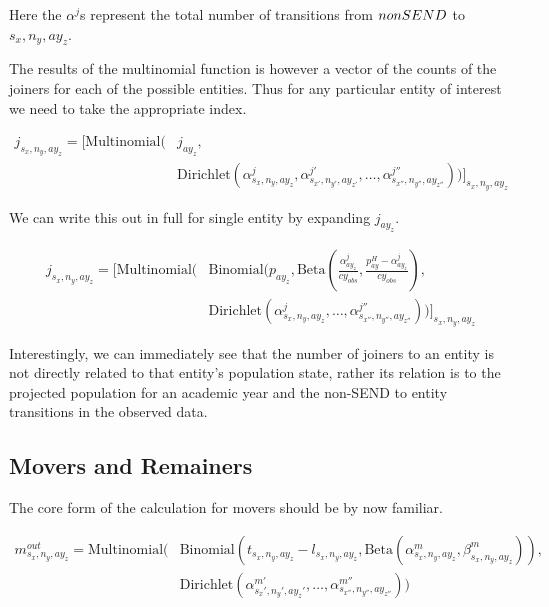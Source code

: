 \documentclass[margin=5mm]{article}
\begin{document}
Here the $\alpha^{j}$s represent the total number of transitions from
$non\-SEND$ to ${s_x,n_y,ay_z}$.

The results of the multinomial function is however a vector of the
counts of the joiners for each of the possible entities.  Thus for any
particular entity of interest we need to take the appropriate index.

\begin{equation*}
  \begin{split}
    j_{s_x,n_y,ay_z} = \bigg[\text{Multinomial}( & j_{ay_z}, \\
    & \text{Dirichlet}(\alpha^{j}_{s_x,n_y,ay_z},\alpha^{j'}_{s_{x'},n_{y'},ay_{z'}}, \dots, \alpha^{j''}_{s_{x''},n_{y''},ay_{z''}}))\bigg]_{s_x,n_y,ay_z}
  \end{split}
\end{equation*}

We can write this out in full for single entity by expanding
$j_{ay_z}$.

\begin{equation*}
  \begin{split}
j_{s_x,n_y,ay_z} = \bigg[\text{Multinomial}( & \text{Binomial}(p_{ay_z},
\text{Beta}(\frac{\alpha^j_{ay_z}}{cy_{obs}},\frac{p^{H}_{ay} -\alpha^j_{ay_z}}{cy_{obs}}), \\
& \text{Dirichlet}(\alpha^{j}_{s_x,n_y,ay_z}, \dots
, \alpha^{j''}_{s_{x''},n_{y''},ay_{z''}}))\bigg]_{s_x,n_y,ay_z}
  \end{split}
\end{equation*}

Interestingly, we can immediately see that the number of joiners to an
entity is not directly related to that entity's population state,
rather its relation is to the projected population for an academic year
and the non-SEND to entity transitions in the observed data.

\subsection{Movers and Remainers}


The core form of the calculation for movers should be by now familiar.

\begin{equation*}
  \begin{split}
m^{out}_{s_x,n_y,ay_z} =
\text{Multinomial}( & \text{Binomial}(t_{s_x,n_y,ay_z} - l_{s_x,n_y,ay_z}, 
 \text{Beta}(\alpha^m_{s_x,n_y,ay_z},\beta^m_{s_x,n_y,ay_z})),
\\ &  \text{Dirichlet}(\alpha^{m'}_{s_x',n_y',ay_z'}, \dots,
\alpha^{m''}_{s_{x''},n_{y''},ay_{z''}}))
\end{split}
\end{equation*}
\end{document}
